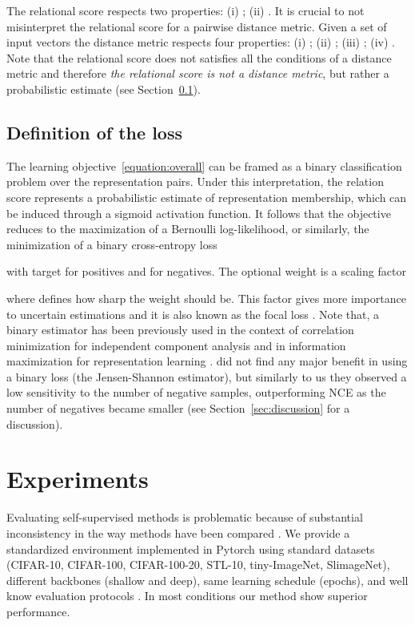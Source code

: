 \documentclass{article}
\begin{document}
The relational score respects two properties: (i) ; (ii) .
It is crucial to not misinterpret the relational score for a pairwise distance metric. Given a set of input vectors  the distance metric  respects four properties: (i) ; (ii) ; (iii) ; (iv) .  Note that the relational score does not satisfies all the conditions of a distance metric and therefore \emph{the relational score is not a distance metric}, but rather a probabilistic estimate (see Section~\ref{ssec:definition_loss}).

\subsection{Definition of the loss}\label{ssec:definition_loss}

The learning objective~\eqref{equation:overall} can be framed as a binary classification problem over the  representation pairs. Under this interpretation, the relation score  represents a probabilistic estimate of representation membership, which can be induced through a sigmoid activation function.
It follows that the objective reduces to the maximization of a Bernoulli log-likelihood, or similarly, the minimization of a binary cross-entropy loss

with target  for positives and  for negatives. The optional weight  is a scaling factor

where  defines how sharp the weight should be. This factor gives more importance to uncertain estimations and it is also known as the focal loss \citep{lin2017focal}.
Note that, a binary estimator has been previously used in the context of correlation minimization for independent component analysis \citep{brakel2017learning} and in information maximization for representation learning \citep{hjelm2018learning}. \cite{hjelm2018learning} did not find any major benefit in using a binary loss (the Jensen-Shannon estimator), but similarly to us they observed a low sensitivity to the number of negative samples, outperforming NCE as the number of negatives became smaller (see Section~\ref{sec:discussion} for a discussion).

\section{Experiments}\label{sec:experiments}

Evaluating self-supervised methods is problematic because of substantial inconsistency in the way methods have been compared \citep{kolesnikov2019revisiting, musgrave2020metric}. We provide a standardized environment implemented in Pytorch using standard datasets (CIFAR-10, CIFAR-100, CIFAR-100-20, STL-10, tiny-ImageNet, SlimageNet), different backbones (shallow and deep), same learning schedule (epochs), and well know evaluation protocols \citep{kolesnikov2019revisiting}. In most conditions our method show superior performance.
\end{document}
